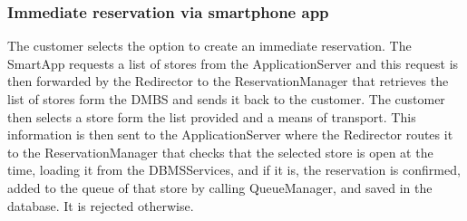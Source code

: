 \subsubsection{Immediate reservation via smartphone app}
\begin{figure}[H]
	\noindent
\end{figure}
The customer selects the option to create an immediate reservation. The SmartApp requests a list of stores from the ApplicationServer and this request is then forwarded by the Redirector to the ReservationManager that retrieves the list of stores form the DMBS and sends it back to the customer. The customer then selects a store form the list provided and a means of transport. This information is then sent to the ApplicationServer where the Redirector routes it to the ReservationManager that checks that the selected store is open at the time, loading it from the DBMSServices, and if it is, the reservation is confirmed, added to the queue of that store by calling QueueManager, and saved in the database. It is rejected otherwise.
